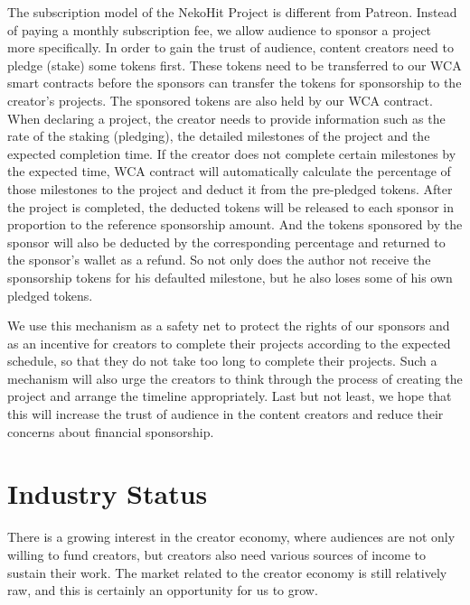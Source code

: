 \documentclass[12pt,a4paper]{article}
\begin{document}
    The subscription model of the NekoHit Project is different from Patreon.
    Instead of paying a monthly subscription fee, we allow audience to sponsor
    a project more specifically. In order to gain the trust of audience, content
    creators need to pledge (stake) some tokens first.
    These tokens need to be transferred to our WCA smart contracts
    before the sponsors can transfer the tokens for sponsorship to
    the creator's projects. The sponsored tokens are also held by our WCA contract.
    When declaring a project, the creator needs to provide information such as
    the rate of the staking (pledging), the detailed milestones of the project and
    the expected completion time.
    If the creator does not complete certain milestones by the expected time,
    WCA contract will automatically calculate the percentage of those milestones
    to the project and deduct it from the pre-pledged tokens.
    After the project is completed, the deducted tokens will be released to each
    sponsor in proportion to the reference sponsorship amount. And the tokens
    sponsored by the sponsor will also be deducted by the corresponding percentage
    and returned to the sponsor's wallet as a refund. So not only does the author
    not receive the sponsorship tokens for his defaulted milestone, but he also loses
    some of his own pledged tokens.

    We use this mechanism as a safety net to protect the rights of our sponsors
    and as an incentive for creators to complete their projects according to the
    expected schedule, so that they do not take too long to complete their projects.
    Such a mechanism will also urge the creators to think through the process of
    creating the project and arrange the timeline appropriately.
    Last but not least, we hope that this will increase the trust of audience in the
    content creators and reduce their concerns about financial sponsorship.


    \section{Industry Status}\label{sec:now}

    There is a growing interest in the creator economy, where audiences are
    not only willing to fund creators, but creators also need various sources
    of income to sustain their work. The market related to the creator economy
    is still relatively raw, and this is certainly an opportunity for us to grow.
\end{document}
